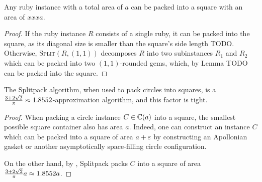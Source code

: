 \documentclass[a4paper,style=print,bibliography=totoc,nexus,lnum,extramargin]{tubsbook}
\begin{document}
%
%

\begin{theorem}\label{th:square}
    Any ruby instance with a total area of $a$ can be packed into a square with an area of $xxx a$.
\end{theorem}

\begin{proof}
    If the ruby instance $R$ consists of a single ruby, it can be packed into the square, as its diagonal size is smaller than the square's side length TODO.
    Otherwise, \textsc{Split}$(R, (1,1))$ decomposes $R$ into two subinstances $R_1$ and $R_2$ which can be packed into two $(1,1)$-rounded gems, which, by Lemma TODO can be packed into the square.
\end{proof}

\begin{theorem}
    The Splitpack algorithm, when used to pack circles into squares, is a $\frac{3+2\sqrt{2}}{\pi} \approx 1.8552$-approximation algorithm, and this factor is tight.
\end{theorem}

\begin{proof}
    When packing a circle instance $C \in \mathbb{C}(a)$ into a square, the smallest possible square container also has area $a$. Indeed, one can construct an instance $C$ which can be packed into a square of area $a+\varepsilon$ by constructing an Apollonian gasket or another asymptotically space-filling circle configuration.

    On the other hand, by , Splitpack packs $C$ into a square of area $\frac{3+2\sqrt{2}}{\pi}a \approx 1.8552a$.
\end{proof}
\end{document}
